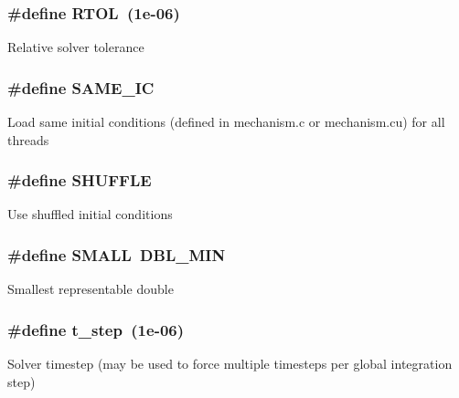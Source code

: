 \subsubsection[{\texorpdfstring{R\+T\+OL}{RTOL}}]{\setlength{\rightskip}{0pt plus 5cm}\#define R\+T\+OL~(1e-\/06)}\hypertarget{solver__options_8cuh_af50ac611d9fae906f9419504fd2caa5d}{}\label{solver__options_8cuh_af50ac611d9fae906f9419504fd2caa5d}
Relative solver tolerance 
\subsubsection[{\texorpdfstring{S\+A\+M\+E\+\_\+\+IC}{SAME_IC}}]{\setlength{\rightskip}{0pt plus 5cm}\#define S\+A\+M\+E\+\_\+\+IC}\hypertarget{solver__options_8cuh_aa98acf0dc83a3dce3ba168d75a74cb1b}{}\label{solver__options_8cuh_aa98acf0dc83a3dce3ba168d75a74cb1b}
Load same initial conditions (defined in mechanism.\+c or mechanism.\+cu) for all threads 
\subsubsection[{\texorpdfstring{S\+H\+U\+F\+F\+LE}{SHUFFLE}}]{\setlength{\rightskip}{0pt plus 5cm}\#define S\+H\+U\+F\+F\+LE}\hypertarget{solver__options_8cuh_a0b43a0be2f674fea3218e7fb5221db1f}{}\label{solver__options_8cuh_a0b43a0be2f674fea3218e7fb5221db1f}
Use shuffled initial conditions 
\subsubsection[{\texorpdfstring{S\+M\+A\+LL}{SMALL}}]{\setlength{\rightskip}{0pt plus 5cm}\#define S\+M\+A\+LL~D\+B\+L\+\_\+\+M\+IN}\hypertarget{solver__options_8cuh_a09c78d2f8feb311dd9fc969a0bf84979}{}\label{solver__options_8cuh_a09c78d2f8feb311dd9fc969a0bf84979}
Smallest representable double 
\subsubsection[{\texorpdfstring{t\+\_\+step}{t_step}}]{\setlength{\rightskip}{0pt plus 5cm}\#define t\+\_\+step~(1e-\/06)}\hypertarget{solver__options_8cuh_aaeb7127cf3bf0b49cec6554fbc101866}{}\label{solver__options_8cuh_aaeb7127cf3bf0b49cec6554fbc101866}
Solver timestep (may be used to force multiple timesteps per global integration step) 
